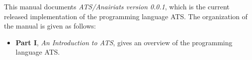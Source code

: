 This manual documents {\em ATS/Anairiats version 0.0.1}, which is the
current released implementation of the programming language ATS.
The organization of the manual is given as follows:

\begin{itemize}
\item{\bf Part I}, {\em An Introduction to ATS}, gives an overview of the
programming language ATS.
\end{itemize}
